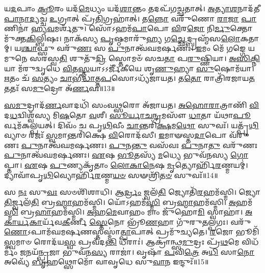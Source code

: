  𑌯\-\ul{𑌦}\-𑌪𑌾𑌂 \ul{𑌕𑍍𑌰𑍂}\-𑌰𑌂 𑌯𑌦᳴\-\ul{𑌮𑍇}\-𑌧𑍍𑌯𑌂 𑌯𑌦᳴\-\ul{𑌶𑌾}\-𑌨𑍍𑌤𑌂 𑌤𑌦𑌪᳴𑌗𑌚𑍍𑌛𑌤𑌾𑌤𑍍। 
 \ul{𑌅}\-\-\ul{𑌤𑍍𑌯𑌾}\-\-\ul{𑌶}\-𑌨𑌾𑌦᳴𑌤𑍀\-\-\ul{𑌪𑌾}\-\-\ul{𑌨𑌾}\-\-\ul{𑌦𑍍𑌯}\-𑌚𑍍𑌚 \ul{𑌉}\-𑌗𑍍𑌰𑌾𑌤𑍍 𑌪𑍍𑌰᳴\-\ul{𑌤𑌿}\-𑌗𑍍𑌰𑌹𑌾॑𑌤𑍍। 
 𑌤\-\ul{𑌨𑍍𑌨𑍋} 𑌵𑌰𑍁᳴𑌣𑍋 \ul{𑌰𑌾}\-\-\ul{𑌜𑌾} \ul{𑌪𑌾}\-𑌣𑌿𑌨𑌾॑ 𑌹𑍍𑌯\-\ul{𑌵}\-𑌮𑌰𑍍\mbox{}𑌶᳴𑌤𑍁। 
 𑌸𑍋᳴𑌽𑌹𑌮᳴\-\ul{𑌪𑌾}\-𑌪𑍋 \ul{𑌵𑌿}\-𑌰\-\ul{𑌜𑍋} 𑌨𑌿\-\ul{𑌰𑍍𑌮𑍁}\-𑌕𑍍𑌤𑍋 𑌮𑍁᳴𑌕𑍍𑌤\-\ul{𑌕𑌿}\-𑌲𑍍𑌬𑌿𑌷𑌃। 
 𑌨𑌾𑌕᳴𑌸𑍍𑌯 \ul{𑌪𑍃}\-𑌷𑍍𑌠𑌮𑌾𑌰𑍁᳴\-\ul{𑌹𑍍𑌯} 𑌗\-\ul{𑌚𑍍𑌛𑍇}\-𑌦𑍍𑌬𑍍𑌰𑌹𑍍𑌮᳴𑌸\-\ul{𑌲𑍋}\-𑌕𑌤𑌾𑌮𑍍। 
 𑌯\-\ul{𑌶𑍍𑌚𑌾}\-𑌫𑍍𑌸𑍁 𑌵𑌰𑍁᳴\-\ul{𑌣𑌃} 𑌸 \ul{𑌪𑍁}\-𑌨𑌾𑌤𑍍𑌵᳴𑌘𑌮𑌰𑍍\mbox{}\-\ul{𑌷}\-𑌣𑌃। 
 \ul{𑌇}\-𑌮𑌂 𑌮𑍇᳴ 𑌗𑌙𑍍𑌗𑍇 𑌯𑌮𑍁𑌨𑍇 𑌸𑌰𑌸𑍍𑌵\-\ul{𑌤𑌿} 𑌶𑍁𑌤𑍁᳴\-\ul{𑌦𑍍𑌰𑌿} 𑌸𑍍𑌤𑍋𑌮𑍞᳴ 𑌸𑌚\-\ul{𑌤𑌾} 𑌪\-\ul{𑌰𑍁}\-𑌷𑍍𑌣𑌿𑌯𑌾। 
 \ul{𑌅}\-\-\ul{𑌸𑌿}\-\-\ul{𑌕𑍍𑌨𑌿}\-𑌯𑌾 𑌮᳴𑌰𑍁𑌦𑍍\mbox{}𑌵𑍃𑌧𑍇 \ul{𑌵𑌿}\-𑌤\-\ul{𑌸𑍍𑌤}\-𑌯𑌾𑌽𑌽𑌰𑍍𑌜𑍀᳴𑌕𑍀𑌯𑍇 𑌶𑍃\-\ul{𑌣𑍁}\-𑌹𑍍𑌯𑌾 \ul{𑌸𑍁}\-𑌷𑍋𑌮᳴𑌯𑌾। 
 \ul{𑌋}\-𑌤𑌂 𑌚᳴ \ul{𑌸}\-𑌤𑍍𑌯𑌂 \ul{𑌚𑌾}\-𑌭𑍀॑\-\ul{𑌦𑍍𑌧𑌾}\-𑌤𑍍𑌤\-\ul{𑌪}\-𑌸𑍋𑌽𑌧𑍍𑌯᳴𑌜𑌾𑌯𑌤। 
 𑌤\-\ul{𑌤𑍋} 𑌰𑌾𑌤𑍍𑌰𑌿᳴𑌰𑌜𑌾𑌯\-\ul{𑌤} 𑌤𑌤𑌃᳴ 𑌸\-\ul{𑌮𑍁}\-𑌦𑍍𑌰𑍋 𑌅᳴\-\ul{𑌰𑍍𑌣}\-𑌵𑌃॥13॥
 
 \ul{𑌸}\-\-\ul{𑌮𑍁}\-𑌦𑍍𑌰𑌾𑌦᳴\-\ul{𑌰𑍍𑌣}\-𑌵𑌾𑌦𑌧𑌿᳴ 𑌸𑌂𑌵\-\ul{𑌥𑍍𑌸}\-𑌰𑍋 𑌅᳴𑌜𑌾𑌯𑌤। 
 \ul{𑌅}\-\-\ul{𑌹𑍋}\-\-\ul{𑌰𑌾}\-𑌤𑍍𑌰𑌾𑌣𑌿᳴ \ul{𑌵𑌿}\-𑌦\-\ul{𑌧}\-𑌦𑍍𑌵𑌿𑌶𑍍𑌵᳴𑌸𑍍𑌯 𑌮𑌿\-\ul{𑌷}\-𑌤𑍋 \ul{𑌵}\-𑌶𑍀। 
 \ul{𑌸𑍂}\-\-\ul{𑌰𑍍𑌯𑌾}\-\-\ul{𑌚}\-\-\ul{𑌨𑍍𑌦𑍍𑌰}\-𑌮𑌸𑍗᳴ \ul{𑌧𑌾}\-𑌤𑌾 𑌯᳴𑌥𑌾\-\ul{𑌪𑍂}\-𑌰𑍍𑌵𑌮᳴\-𑌕𑌲𑍍𑌪\-𑌯𑌤𑍍। 
 𑌦𑌿𑌵𑌂᳴ 𑌚 𑌪𑍃\-\ul{𑌥𑌿}\-𑌵𑍀𑌂 \ul{𑌚𑌾}\-𑌨𑍍𑌤𑌰𑌿᳴\-\ul{𑌕𑍍𑌷}\-𑌮\-\ul{𑌥𑍋} 𑌸𑍁𑌵𑌃᳴। 
 𑌯𑌤𑍍𑌪𑍃᳴\-\ul{𑌥𑌿}\-𑌵𑍍𑌯𑌾𑍞 𑌰𑌜𑌃᳴ \ul{𑌸𑍍𑌵}\-𑌮𑌾𑌨𑍍𑌤𑌰𑌿᳴𑌕𑍍𑌷𑍇 \ul{𑌵𑌿}\-𑌰𑍋𑌦᳴𑌸𑍀। 
 \ul{𑌇}\-𑌮𑌾𑍟𑌸𑍍𑌤\-\ul{𑌦𑌾}\-𑌪𑍋 𑌵᳴𑌰𑍁𑌣𑌃 \ul{𑌪𑍁}\-𑌨𑌾𑌤𑍍𑌵᳴𑌘𑌮𑌰𑍍\mbox{}\-\ul{𑌷}\-𑌣𑌃। 
 \ul{𑌪𑍁}\-𑌨\-\ul{𑌨𑍍𑌤𑍁} 𑌵𑌸᳴𑌵𑌃 \ul{𑌪𑍁}\-𑌨𑌾\-\ul{𑌤𑍁} 𑌵𑌰𑍁᳴𑌣𑌃 \ul{𑌪𑍁}\-𑌨𑌾𑌤𑍍𑌵᳴𑌘𑌮𑌰𑍍\mbox{}\-\ul{𑌷}\-𑌣𑌃। 
 \ul{𑌏}\-𑌷 \ul{𑌭𑍂}\-𑌤𑌸𑍍𑌯᳴ \ul{𑌮}\-𑌧𑍍𑌯𑍇 𑌭𑍁𑌵᳴𑌨𑌸𑍍𑌯 \ul{𑌗𑍋}\-𑌪𑍍𑌤𑌾। 
 \ul{𑌏}\-𑌷 \ul{𑌪𑍁}\-𑌣𑍍𑌯𑌕𑍃᳴𑌤𑌾𑌂 \ul{𑌲𑍋}\-\-\ul{𑌕𑌾}\-\-\ul{𑌨𑍇}\-𑌷 \ul{𑌮𑍃}\-𑌤𑍍𑌯𑍋𑌰𑍍\mbox{}𑌹𑌿᳴\-\ul{𑌰}\-𑌣𑍍𑌮𑌯𑌮𑍍॑। 
 𑌦𑍍𑌯𑌾𑌵𑌾᳴𑌪𑍃\-\ul{𑌥𑌿}\-𑌵𑍍𑌯𑍋𑌰𑍍\mbox{}𑌹𑌿᳴\-\ul{𑌰}\-𑌣𑍍𑌮\-\ul{𑌯}\-\-\ul{𑍞} 𑌸𑍟𑌶𑍍𑌰𑌿᳴\-\ul{𑌤}\-\-\ul{𑍞} 𑌸𑍁𑌵𑌃᳴॥14॥

𑌸 \ul{𑌨𑌃} 𑌸𑍁\-\ul{𑌵𑌃} 𑌸𑍞𑌶𑌿᳴𑌶𑌾𑌧𑌿। 
𑌆\-\ul{𑌰𑍍𑌦𑍍𑌰𑌂} 𑌜𑍍𑌵𑌲᳴\-\ul{𑌤𑌿} 𑌜𑍍𑌯𑍋𑌤𑌿᳴\-\ul{𑌰}\-𑌹𑌮᳴𑌸𑍍𑌮𑌿। 
𑌜𑍍𑌯𑍋\-\ul{𑌤𑌿}\-𑌰𑍍𑌜𑍍𑌵𑌲᳴\-\ul{𑌤𑌿} 𑌬𑍍𑌰\-\ul{𑌹𑍍𑌮𑌾}\-𑌹𑌮᳴𑌸𑍍𑌮𑌿। 
𑌯𑍋᳴𑌽𑌹𑌮᳴\-\ul{𑌸𑍍𑌮𑌿} 𑌬𑍍𑌰\-\ul{𑌹𑍍𑌮𑌾}\-𑌹𑌮᳴𑌸𑍍𑌮𑌿। 
\-\ul{𑌅}\-𑌹𑌮᳴\-\ul{𑌸𑍍𑌮𑌿} 𑌬𑍍𑌰\-\ul{𑌹𑌾}\-𑌹𑌮᳴𑌸𑍍𑌮𑌿। 
\-\ul{𑌅}\-𑌹\-\ul{𑌮𑍇}\-𑌵𑌾𑌹𑌂 𑌮𑌾𑌂 𑌜𑍁᳴𑌹𑍋\-\ul{𑌮𑌿} 𑌸𑍍𑌵𑌾𑌹𑌾॑। 
\-\ul{𑌅}\-\-\ul{𑌕𑌾}\-\-\ul{𑌰𑍍𑌯}\-\-\ul{𑌕𑌾}\-𑌰𑍍𑌯᳴𑌵\-\ul{𑌕𑍀}\-𑌰𑍍𑌣𑍀 \ul{𑌸𑍍𑌤𑍇}\-𑌨𑍋 𑌭𑍍𑌰𑍂᳴\-\ul{𑌣}\-𑌹𑌾 𑌗𑍁᳴𑌰𑍁\-\ul{𑌤}\-𑌲𑍍𑌪𑌗𑌃। 
𑌵𑌰𑍁᳴\-\ul{𑌣𑍋}\-𑌽𑌪𑌾𑌮᳴𑌘\-𑌮𑌰𑍍\mbox{}\-\ul{𑌷}\-𑌣𑌸𑍍𑌤𑌸𑍍𑌮𑌾॑\-\ul{𑌤𑍍𑌪𑌾}\-𑌪𑌾𑌤𑍍 𑌪𑍍𑌰𑌮𑍁᳴𑌚𑍍𑌯𑌤𑍇। 
\-\ul{𑌰}\-𑌜𑍋 𑌭𑍂𑌮𑌿᳴\-\ul{𑌸𑍍𑌤𑍍𑌵}\-𑌮𑌾𑍞 𑌰𑍋𑌦᳴𑌯\-\ul{𑌸𑍍𑌵} 𑌪𑍍𑌰𑌵᳴𑌦\-\ul{𑌨𑍍𑌤𑌿} 𑌧𑍀𑌰𑌾𑌃॑। 
𑌆𑌕𑍍𑌰𑌾॑𑌨𑍍𑌥𑍍𑌸\-\ul{𑌮𑍁}\-𑌦𑍍𑌰𑌃 𑌪𑍍𑌰᳴\-\ul{𑌥}\-𑌮𑍇 𑌵𑌿𑌧᳴𑌰𑍍𑌮𑌂 \ul{𑌜}\-𑌨𑌯᳴\-\ul{𑌨𑍍𑌪𑍍𑌰}\-𑌜𑌾 𑌭𑍁𑌵᳴𑌨\-\ul{𑌸𑍍𑌯} 𑌰𑌾𑌜𑌾॑। 
𑌵𑍃𑌷𑌾᳴ \ul{𑌪}\-𑌵𑌿\-\ul{𑌤𑍍𑌰𑍇} 𑌅\-\ul{𑌧𑌿} 𑌸𑌾\-\ul{𑌨𑍋} 𑌅𑌵𑍍𑌯𑍇᳴ \ul{𑌬𑍃}\-𑌹𑌥𑍍𑌸𑍋𑌮𑍋᳴ 𑌵𑌾𑌵𑍃𑌧𑍇 𑌸𑍁\-\ul{𑌵𑌾}\-𑌨 𑌇𑌨𑍍𑌦𑍁𑌃᳴॥15॥
\anuvakamend

